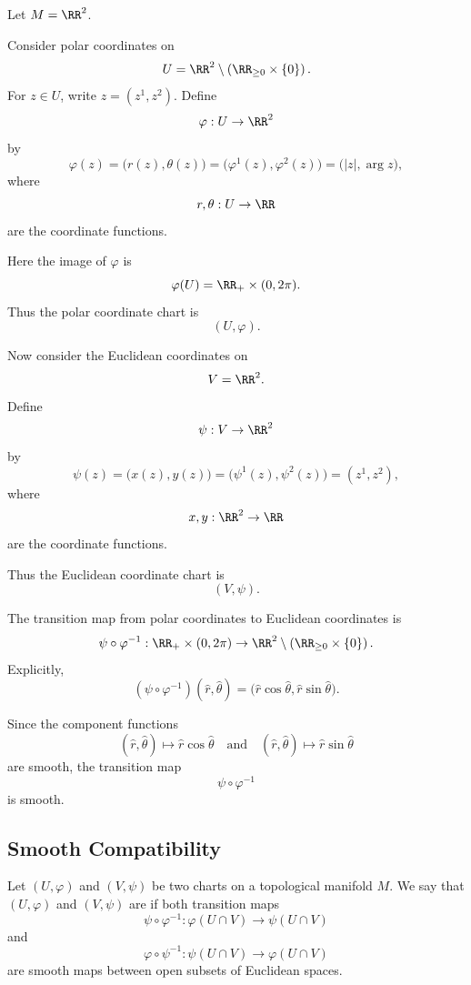 \begin{example}
Let $M=\RR^2$.

Consider polar coordinates on
\[
  U=\RR^2\setminus \left(\RR_{\ge 0}\times \{0\}\right).
\]
For $z\in U$, write $z=(z^1,z^2)$. Define
\[
  \varphi:U\to \RR^2
\]
by
\[
  \varphi(z)
  =
  \bigl(r(z),\theta(z)\bigr)
  =
  \bigl(\varphi^1(z),\varphi^2(z)\bigr)
  =
  \bigl(|z|,\arg z\bigr),
\]
where
\[
  r,\theta:U\to \RR
\]
are the coordinate functions.

Here the image of $\varphi$ is
\[
  \varphi(U)=\RR_+\times (0,2\pi).
\]
Thus the polar coordinate chart is
\[
  (U,\varphi).
\]
\end{example}

\begin{example}
Now consider the Euclidean coordinates on
\[
  V=\RR^2.
\]
Define
\[
  \psi:V\to \RR^2
\]
by
\[
  \psi(z)
  =
  \bigl(x(z),y(z)\bigr)
  =
  \bigl(\psi^1(z),\psi^2(z)\bigr)
  =
  (z^1,z^2),
\]
where
\[
  x,y:\RR^2\to \RR
\]
are the coordinate functions.

Thus the Euclidean coordinate chart is
\[
  (V,\psi).
\]
\end{example}

The transition map from polar coordinates to Euclidean coordinates is
\[
  \psi\circ \varphi^{-1}:\RR_+\times (0,2\pi)
  \to
  \RR^2\setminus \left(\RR_{\ge 0}\times \{0\}\right).
\]
Explicitly,
\[
  (\psi\circ \varphi^{-1})(\widehat r,\widehat\theta)
  =
  \bigl(\widehat r\cos \widehat\theta,
  \widehat r\sin \widehat\theta\bigr).
\]

Since the component functions
\[
  (\widehat r,\widehat\theta)
  \mapsto
  \widehat r\cos \widehat\theta
  \quad\text{and}\quad
  (\widehat r,\widehat\theta)
  \mapsto
  \widehat r\sin \widehat\theta
\]
are smooth, the transition map
\[
  \psi\circ \varphi^{-1}
\]
is smooth.

\subsection{Smooth Compatibility}

\begin{definition}
Let $(U,\varphi)$ and $(V,\psi)$ be two charts on a topological manifold $M$.
We say that $(U,\varphi)$ and $(V,\psi)$ are  if both transition maps
\[
  \psi\circ \varphi^{-1} :
  \varphi(U\cap V) \to \psi(U\cap V)
\]
and
\[
  \varphi\circ \psi^{-1} :
  \psi(U\cap V) \to \varphi(U\cap V)
\]
are smooth maps between open subsets of Euclidean spaces.
\end{definition}

